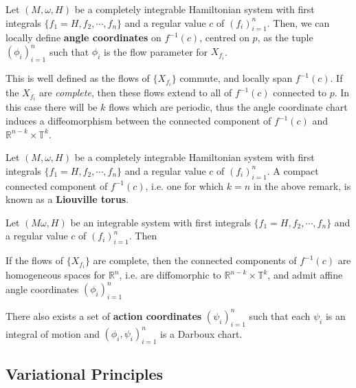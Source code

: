 \documentclass[11pt, final]{article}
\begin{document}
\begin{definition}
	Let $(M,\omega,H)$ be a completely integrable Hamiltonian system with first integrals $\{f_1=H, f_2, \cdots, f_n\}$ and a regular value $c$ of $(f_i)_{i=1}^n$. Then, we can locally define \textbf{angle coordinates} on $f^{-1}(c)$, centred on $p$, as the tuple $(\phi_i)_{i=1}^n$ such that $\phi_i$ is the flow parameter for $X_{f_i}$.
\end{definition}
\begin{remark}
	This is well defined as the flows of $\{X_{f_i}\}$ commute, and locally span $f^{-1}(c)$. If the $X_{f_i}$ are \textit{complete}, then these flows extend to all of $f^{-1}(c)$ connected to $p$. In this case there will be $k$ flows which are periodic, thus the angle coordinate chart induces a diffeomorphism between the connected component of $f^{-1}(c)$ and $\mathbb{R}^{n-k}\times\mathbb{T}^k$.
\end{remark}

\begin{definition}
	Let $(M,\omega,H)$ be a completely integrable Hamiltonian system with first integrals $\{f_1=H, f_2, \cdots, f_n\}$ and a regular value $c$ of $(f_i)_{i=1}^n$. A compact connected component of $f^{-1}(c)$, i.e. one for which $k=n$ in the above remark, is known as a \textbf{Liouville torus}.
\end{definition}

\begin{theorem}
	Let $(M\omega,H)$ be an integrable system with first integrals $\{f_1=H, f_2, \cdots, f_n\}$ and a regular value $c$ of $(f_i)_{i=1}^n$. Then
		\begin{ronumerate}
			\item If the flows of $\{ X_{f_i} \}$ are complete, then the connected components of $f^{-1}(c)$ are homogeneous spaces for $\mathbb{R}^n$, i.e. are diffomorphic to $\mathbb{R}^{n-k}\times\mathbb{T}^k$, and admit affine angle coordinates $(\phi_i)_{i=1}^n$
			
			\item There also exists a set of \textbf{action coordinates} $(\psi_i)_{i=1}^n$ such that each $\psi_i$ is an integral of motion and $(\phi_i,\psi_i)_{i=1}^n$ is a Darboux chart.
		\end{ronumerate}
\end{theorem}

\subsection{Variational Principles}
\end{document}
